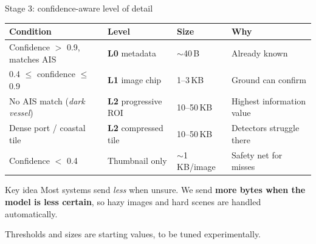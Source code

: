 \documentclass[aspectratio=169,10pt]{beamer}
\begin{document}
\begin{frame}{Stage 3: confidence-aware level of detail}
\footnotesize
\renewcommand{\arraystretch}{1.15}
\begin{tabularx}{\textwidth}{@{}P{4.4cm} P{3.0cm} P{1.9cm} L@{}}
\toprule
\textbf{Condition} & \textbf{Level} & \textbf{Size} & \textbf{Why} \\
\midrule
Confidence $>$ 0.9, matches AIS & \textcolor{good}{\textbf{L0}} metadata & $\sim$40\,B & Already known \\
0.4 $\leq$ confidence $\leq$ 0.9 & \textcolor{ocean}{\textbf{L1}} image chip & 1--3\,KB & Ground can confirm \\
No AIS match (\emph{dark vessel}) & \textcolor{accent}{\textbf{L2}} progressive ROI & 10--50\,KB & Highest information value \\
Dense port / coastal tile & \textcolor{accent}{\textbf{L2}} compressed tile & 10--50\,KB & Detectors struggle there \\
Confidence $<$ 0.4 & Thumbnail only & $\sim$1\,KB/image & Safety net for misses \\
\bottomrule
\end{tabularx}
\vspace{2mm}
\begin{alertblock}{Key idea}
Most systems send \emph{less} when unsure. We send \textbf{more bytes when the model is less certain}, so hazy images and hard scenes are handled automatically.
\end{alertblock}
{\scriptsize\color{muted} Thresholds and sizes are starting values, to be tuned experimentally.}
\end{frame}
\end{document}
